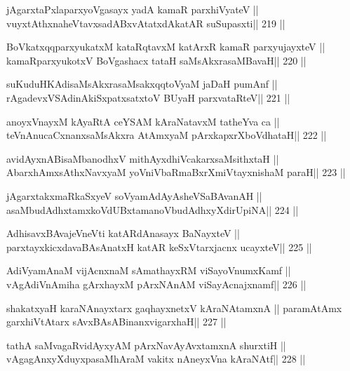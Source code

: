 \begin{shl}
jAgarxtaPxlaparxyoVgasayx yadA kamaR parxhiVyateV ||
vuyxtAthxnaheVtavxsadABxvAtatxdA\s katAR suSupasxti\hfill || 219 ||
\end{shl}

\begin{shl}
BoVkatxqqparxyukatxM kataRqtavxM katArxR kamaR parxyujayxteV ||
kamaRparxyukotxV BoVgashacx tataH saMsAkxrasaMBavaH\hfill || 220 ||
\end{shl}

\begin{shl}
suKuduHKAdisaMsAkxrasaMsakxqqtoV\s yaM jaDaH pumAnf ||
rAgadevxVSAdinA\s\s kiSxpatxsatxtoV BUyaH parxvataRteV\hfill || 221 ||
\end{shl}

\begin{shl}
anoyxVnayxM kAyaRtA ceYSAM kAraNatavxM tatheYva ca ||
teVnAnucaCxnanxsaMsAkxra AtAmx\s yaM pArxkapxrXboVdhataH\hfill || 222 ||
\end{shl}

\begin{shl}
avidAyxnABisaMbanodhxV mithAyxdhiVcakarxsaMsithxtaH ||
AbarxhAmx\s\s sAthxNavxyaM yoVniVbaRmaBxrXmiVtayxnishaM paraH\hfill || 223 ||
\end{shl}

\begin{shl}
jAgarxtakxmaRkaSxyeV soV\s yamAdAyAsheVSaBAvanAH ||
asaMbudAdhxtamxkoVdUBxtamanoVbudAdhxyXdirUpiNA\hfill || 224 ||
\end{shl}

\begin{shl}
AdhisavxBAvajeVneVti katAR\s\s dAnasayx BaNayxteV ||
parxtayxkicxdavaBAsAnatxH katAR keSxVtarxjacnx ucayxteV\hfill || 225 ||
\end{shl}

\begin{shl}
AdiVyamAnaM vijAcnxnaM sAmathayxRM viSayoVnumxKamf ||
vAgAdiVnAmiha gArxhayxM pArxNAnAM viSayAcnajxnamf\hfill || 226 ||
\end{shl}

\begin{shl}
shakatxyaH karaNAnayxtarx gaqhayxnetxV kAraNAtamxnA ||
paramAtAmx garxhiVtA\s tarx sAvxBAsABinanxvigarxhaH\hfill || 227 ||
\end{shl}

\begin{shl}
tathA saMvagaRvidAyxyAM pArxNavAyAvxtamxnA shurxtiH ||
vAgagAnxyXduyxpasaMhAraM vakitx nAneyxVna kAraNAtf\hfill || 228 ||
\end{shl}

